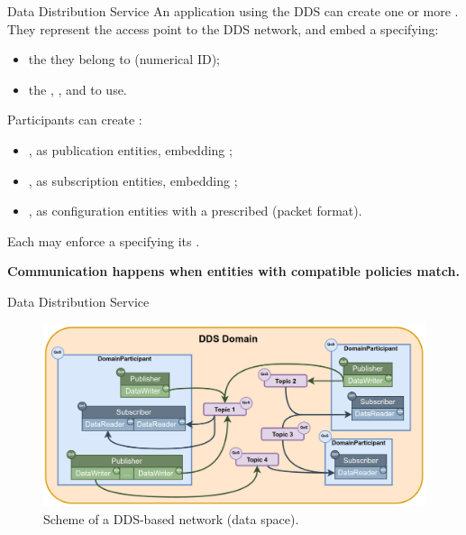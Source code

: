 \begin{frame}{Data Distribution Service}
An application using the DDS can create one or more .\\
They represent the access point to the DDS network, and embed a  specifying:
\begin{itemize}
  \item the  they belong to (numerical ID);
  \item the , , and  to use.
\end{itemize}
\bigskip
Participants can create :
\begin{itemize}
  \item {}, as publication entities, embedding ;
  \item {}, as subscription entities, embedding ;
  \item {}, as configuration entities with a prescribed  (packet format).
\end{itemize}
Each may enforce a  specifying its .
\begin{block}{}
  \centering
  \textbf{Communication happens when entities with compatible policies match.}
\end{block}
\end{frame}
\begin{frame}{Data Distribution Service}
	\begin{figure}
		\centering
		\includegraphics[width=.85\textwidth]{dds_domain}
		\caption{Scheme of a DDS-based network (data space).}
		\label{fig:ddsdomain}
	\end{figure}
\end{frame}
